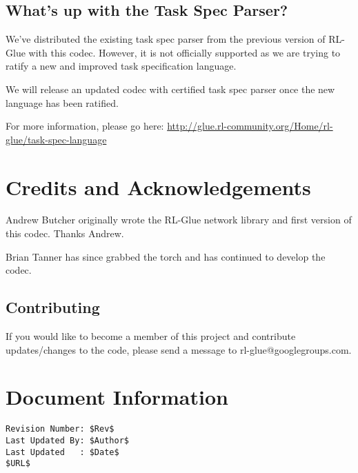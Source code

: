\documentclass[11pt]{article}
\begin{document}
\subsection{What's up with the Task Spec Parser?}
We've distributed the existing task spec parser from the previous version of RL-Glue with this codec. 
However, it is not officially supported as we are trying to ratify a new and improved task 
specification language.

We will release an updated codec with certified task spec parser once the new language has been 
ratified.

For more information, please go here:\newline
\url{http://glue.rl-community.org/Home/rl-glue/task-spec-language}

\section{Credits and Acknowledgements}
Andrew Butcher originally wrote the RL-Glue network library and first version of this codec.  Thanks Andrew.

Brian Tanner has since grabbed the torch and has continued to develop the codec.

\subsection{Contributing}
If you would like to become a member of this project and contribute updates/changes to the code, please send a message to rl-glue@googlegroups.com.


\section*{Document Information}
\begin{verbatim}
Revision Number: $Rev$
Last Updated By: $Author$
Last Updated   : $Date$
$URL$
\end{verbatim}
\end{document}
